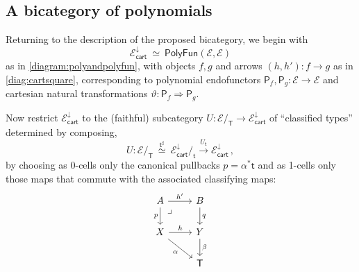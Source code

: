 \documentclass[12pt,reqno]{amsart}
\newcommand{\EE}{\ensuremath{\mathcal{E}}}
\newcommand{\alg}[1]{\ensuremath{\mathsf{#1}}}
\newcommand{\hook}{\ensuremath{\hookrightarrow}}
\renewcommand{\to}{\ensuremath{\rightarrow}}
\newcommand{\too}{\ensuremath{\longrightarrow}}
\renewcommand{\t}{\ensuremath{\mathsf{t}}}
\newcommand{\T}{\ensuremath{\mathsf{T}}}
\newcommand{\TT}{\ensuremath{\dot{\mathsf{T}}}}
\newcommand{\pbcorner}{\arrow[dr,phantom,"\lrcorner" very near start, shift right=.5ex]} %
\newtheorem{proposition}[theorem]{Proposition}
\theoremstyle{remark}
\theoremstyle{definition}
\begin{document}
\subsection{A bicategory of polynomials}\label{sec:2cells}

Returning to the description of the proposed bicategory, we begin with
\[
\EE^{\downarrow}_{\mathsf{cart}}\ \simeq\ \mathsf{PolyFun}(\EE, \EE)
\]
as in \eqref{diagram:polyandpolyfun}, with objects $f, g$ and arrows $(h, h') : f \to g$ as in \eqref{diag:cartsquare}, corresponding to polynomial endofunctors $\alg{P}_f, \alg{P}_g : \EE \to \EE$ and cartesian natural transformations $\vartheta : \alg{P}_f \Rightarrow \alg{P}_g$.

Now restrict $\EE^{\downarrow}_{\mathsf{cart}}$ to the (faithful) subcategory $U : \EE/_\T \to \EE^{\downarrow}_{\mathsf{cart}}$ of ``classified types'' determined by composing,
\begin{equation}\label{eq:faithfulU}
U : \EE/_\T\ \stackrel{\t^{\sharp}}{\simeq}\ \EE^{\downarrow}_{\mathsf{cart}} /_\t \stackrel{U_\t}{\too} \EE^{\downarrow}_{\mathsf{cart}}\,,
\end{equation}
by choosing as 0-cells only the canonical  pullbacks $p = \alpha^{*}\t$ and as 1-cells only those maps that commute with the associated classifying maps:
\begin{equation}\label{diag:classified1cells}
\begin{tikzcd}
A \ar[d,swap, "p"] \ar[r, "{h'}"] \pbcorner & B \ar[d, "q"] \\
X \ar[r,swap,swap, "{h}"] \ar[rd,swap, "\alpha"] &  Y \ar[d, "\beta"]\\
& \T
\end{tikzcd}
\end{equation}
%
%
\end{document}
